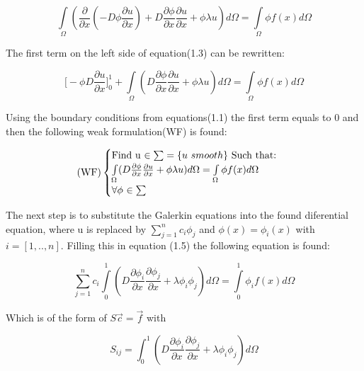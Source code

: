 \documentclass[a4paper]{report}
\begin{document}
\begin{equation}
	\int\limits_{\Omega} (\frac{\partial}{\partial x} (-D\phi\frac{\partial u}{\partial x}) + D\frac{\partial \phi}{\partial x} \frac{\partial u}{\partial x} +\phi \lambda u) d\Omega = \int\limits_{\Omega} \phi f(x) d\Omega 
\end{equation}
\smallskip

 The first term on the left side of equation(1.3) can be rewritten:


\begin{equation}
	\big[-\phi D \frac{\partial u}{\partial x}\big]_{0}^{1}  + \int\limits_{\Omega}  (D\frac{\partial \phi}{\partial x}\frac{\partial u}{\partial x} +\phi\lambda u )d\Omega = \int\limits_{\Omega} \phi f(x) d\Omega 
\end{equation}
\smallskip

Using the boundary conditions from equations(1.1) the first term equals to 0 and then the following weak formulation(WF) is found: \vspace{5mm}


\begin{equation}
\text{(WF)}
\begin{cases} 
	$Find u $\in \sum =\{u$ $ smooth\}$ Such that:$ \\ \int\limits_{\Omega}  (D\frac{\partial \phi}{\partial x}\frac{\partial u}{\partial x} +\phi\lambda u )d\Omega = \int\limits_{\Omega} \phi f(x) d\Omega \\ \forall\phi $ $ \in\sum 
\end{cases}\  
\end{equation}

\bigskip
The next step is to substitute the Galerkin equations into the found diferential equation, where u is replaced by $ \sum_{j=1}^{n}c_i\phi_j $ and  $\phi(x)=\phi_i(x)$ with $i = [1,..,n]$. Filling this in equation (1.5) the following equation is found:

\begin{equation}
	\sum\limits_{j=1}^{n}c_i\int\limits_{0}^{1} (D\frac{\partial \phi_i}{\partial x}\frac{\partial \phi_j}{\partial x} +\lambda\phi_i\phi_j )d\Omega = \int\limits_{0}^{1} \phi_i f(x) d\Omega
\end{equation}
\medskip

Which is of the form of $ S\vec{c} = \vec{f} $ with

\begin{equation}
S_{ij} =	\int_{0}^{1} (D\frac{\partial \phi_i}{\partial x}\frac{\partial \phi_j}{\partial x} +\lambda\phi_i\phi_j )d\Omega
\end{equation}
\end{document}
